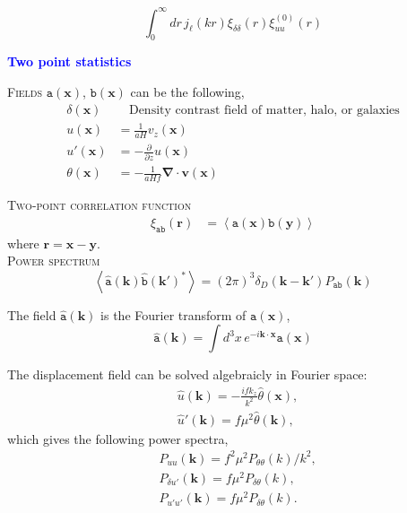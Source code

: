 \documentclass[a4paper,11pt, fleqn]{article}
\begin{document}
  


\begin{equation}
  \int_0^\infty \! dr \, j_\ell(kr) \xi_{\delta\delta}(r) \xi_{uu}^{(0)}(r)
\end{equation}

%
%

%
%
\newpage
{\Huge \textbf{\textcolor{Blue}{Two point statistics}}}
\vspace{5mm}

\textsc{Fields} $\mathtt{a}(\bm{x})$, $\mathtt{b}(\bm{x})$ can be the following,
\begin{align}
  \delta(\bm{x}) &\phantom{=\,} \mbox{Density contrast field of matter, halo, or galaxies}\\
  u(\bm{x}) &= \frac{1}{aH} v_z(\bm{x})\\
  u'(\bm{x}) &= -\frac{\partial}{\partial z} u(\bm{x})\\
  \theta(\bm{x}) &= - \frac{1}{aHf} \bm{\nabla}\cdot \bm{v}(\bm{x})
\end{align}

\textsc{Two-point correlation function}
\begin{align}
  \xi_{\mathtt{ab}}(\bm{r}) &= \left\langle \mathtt{a}(\bm{x}) \mathtt{b}(\bm{y})
                             \right\rangle
\end{align}
where $\bm{r} = \bm{x} - \bm{y}$.\\


\textsc{Power spectrum}
\begin{equation}
  \left\langle \hat{\mathtt{a}}(\bm{k}) \hat{\mathtt{b}}(\bm{k}')^* \right\rangle
  = (2\pi)^3 \delta_D(\bm{k}-\bm{k}') P_{\mathtt{ab}}(\bm{k})
\end{equation}

The field $\hat{\texttt{a}}(\bm{k})$ is
the Fourier transform of $\texttt{a}(\bm{x})$, 
\begin{equation}
  \hat{\texttt{a}}(\bm{k}) =
  \int\! d^3 x \, e^{-i\bm{k}\cdot\bm{x}} \texttt{a}(\bm{x})
\end{equation}



The displacement field can be solved algebraicly in Fourier space:
\begin{align}
  &\hat{u}(\bm{k}) = -\frac{ifk_z}{k^2} \hat{\theta}(\bm{x}),\\
  &\hat{u}'(\bm{k}) = f\mu^2 \hat{\theta}(\bm{k}),
\end{align}
%
which gives the following power spectra,
%
\begin{align}
  &P_{uu}(\bm{k}) = f^2\mu^2 P_{\theta\theta}(k)/k^2,\\
  &P_{\delta u'}(\bm{k}) = f \mu^2 P_{\delta \theta}(k),\\
  &P_{u' u'}(\bm{k}) = f \mu^2 P_{\delta \theta}(k).\\
\end{align}
\end{document}
